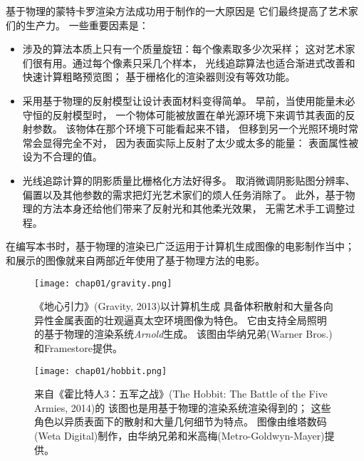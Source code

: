 基于物理的蒙特卡罗渲染方法成功用于制作的一大原因是
它们最终提高了艺术家们的生产力。
一些重要因素是：
\begin{itemize}
    \item 涉及的算法本质上只有一个质量旋钮：每个像素取多少次采样；
          这对艺术家们很有用。通过每个像素只采几个样本，
          光线追踪算法也适合渐进式改善和快速计算粗略预览图；
          基于栅格化的渲染器则没有等效功能。
    \item 采用基于物理的反射模型让设计表面材料变得简单。
          早前，当使用能量未必守恒的反射模型时，
          一个物体可能被放置在单光源环境下来调节其表面的反射参数。
          该物体在那个环境下可能看起来不错，
          但移到另一个光照环境时常常会显得完全不对，
          因为表面实际上反射了太少或太多的能量：
          表面属性被设为不合理的值。
    \item 光线追踪计算的阴影质量比栅格化方法好得多。
          取消微调阴影贴图分辨率、偏置以及其他参数的需求把灯光艺术家们的烦人任务消除了。
          此外，基于物理的方法本身还给他们带来了反射光和其他柔光效果，
          无需艺术手工调整过程。
\end{itemize}

在编写本书时，基于物理的渲染已广泛运用于计算机生成图像的电影制作当中；
和展示的图像就来自两部近年使用了基于物理方法的电影。
\begin{figure}[htbp]
    \centering\texttt{[image: chap01/gravity.png]}
    \caption{《地心引力》(Gravity, 2013)以计算机生成
        具备体积散射和大量各向异性金属表面的壮观逼真太空环境图像为特色。
        它由支持全局照明的基于物理的渲染系统\emph{Arnold}生成。
        该图由华纳兄弟(Warner Bros.)和Framestore提供。
    }
    \label{fig:1.22}
\end{figure}
\begin{figure}[htbp]
    \centering\texttt{[image: chap01/hobbit.png]}
    \caption{来自《霍比特人3：五军之战》(The Hobbit: The Battle of the Five Armies, 2014)的
        该图也是用基于物理的渲染系统渲染得到的；
        这些角色以异质表面下的散射和大量几何细节为特点。
        图像由维塔数码(Weta Digital)制作，由华纳兄弟和米高梅(Metro-Goldwyn-Mayer)提供。}
    \label{fig:1.23}
\end{figure}
